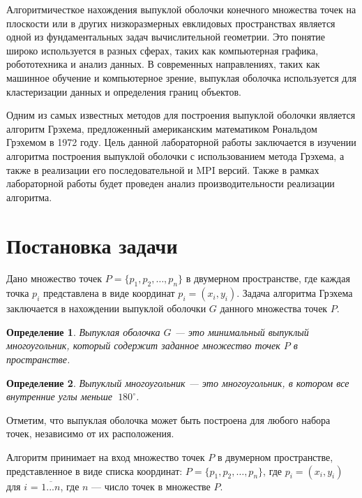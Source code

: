 \documentclass[a4paper,12pt]{article}
\newtheorem{definition}{Определение}[section]
\begin{document}
\hspace*{15pt}	Алгоритмичесткое нахождения выпуклой оболочки конечного множества точек на плоскости или в других низкоразмерных евклидовых пространствах является одной из  фундаментальных задач вычислительной геометрии. Это понятие широко используется в разных сферах, таких как компьютерная графика, робототехника и анализ данных. В современных направлениях, таких как машинное обучение и компьютерное зрение, выпуклая оболочка используется для кластеризации данных и определения границ объектов.

Одним из самых известных методов для построения выпуклой оболочки является алгоритм Грэхема, предложенный американским математиком Рональдом Грэхемом в 1972 году. 
Цель данной лабораторной работы заключается в изучении алгоритма построения выпуклой оболочки с использованием метода Грэхема, а также в реализации его последовательной и MPI версий. Также в рамках лабораторной работы будет проведен анализ производительности реализации алгоритма.

\newpage

\section{Постановка задачи}

\hspace*{15pt}Дано множество точек \( P = \{ p_1, p_2, \ldots, p_n \} \) в двумерном пространстве, где каждая точка \( p_i \) представлена в виде координат \( p_i = (x_i, y_i) \). Задача алгоритма Грэхема заключается в нахождении выпуклой оболочки \( G \) данного множества точек \( P \).

\begin{definition}\label{d1}
	\textit{Выпуклая оболочка $G$} — это минимальный выпуклый многоугольник, который содержит заданное множество точек $P$ в пространстве.
\end{definition}


\begin{definition}\label{d2}
    \textit{Выпуклый многоугольник} — это многоугольник, в котором все внутренние углы меньше $\ 180^\circ$.
\end{definition}

Отметим, что выпуклая оболочка может быть построена для любого набора точек, независимо от их расположения.

Алгоритм принимает на вход множество точек \( P \) в двумерном пространстве, представленное в виде списка координат: \( P = \{ p_1, p_2, \ldots, p_n \} \), где \( p_i = ( x_i, y_i ) \) для $i$ = $\overline{1...n}$, где \( n \) — число точек в множестве \( P \).
\end{document}
